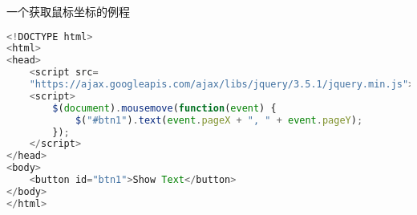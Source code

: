 一个获取鼠标坐标的例程
\begin{lstlisting}[language=js]
<!DOCTYPE html>
<html>
<head>
	<script src=
	"https://ajax.googleapis.com/ajax/libs/jquery/3.5.1/jquery.min.js"></script>
	<script>
		$(document).mousemove(function(event) {
			$("#btn1").text(event.pageX + ", " + event.pageY);
		});
	</script>
</head>
<body>
	<button id="btn1">Show Text</button>
</body>
</html>
\end{lstlisting}
